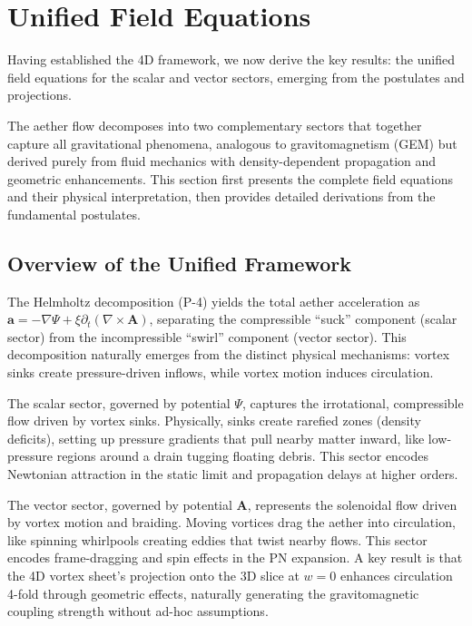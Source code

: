 \documentclass{article}
\begin{document}
\section{Unified Field Equations}

Having established the 4D framework, we now derive the key results: the unified field equations for the scalar and vector sectors, emerging from the postulates and projections.

The aether flow decomposes into two complementary sectors that together capture all gravitational phenomena, analogous to gravitomagnetism (GEM) but derived purely from fluid mechanics with density-dependent propagation and geometric enhancements. This section first presents the complete field equations and their physical interpretation, then provides detailed derivations from the fundamental postulates.

\subsection{Overview of the Unified Framework}

The Helmholtz decomposition (P-4) yields the total aether acceleration as $\mathbf{a} = -\nabla \Psi + \xi \partial_t (\nabla \times \mathbf{A})$, separating the compressible ``suck'' component (scalar sector) from the incompressible ``swirl'' component (vector sector). This decomposition naturally emerges from the distinct physical mechanisms: vortex sinks create pressure-driven inflows, while vortex motion induces circulation.

The scalar sector, governed by potential $\Psi$, captures the irrotational, compressible flow driven by vortex sinks. Physically, sinks create rarefied zones (density deficits), setting up pressure gradients that pull nearby matter inward, like low-pressure regions around a drain tugging floating debris. This sector encodes Newtonian attraction in the static limit and propagation delays at higher orders.

The vector sector, governed by potential $\mathbf{A}$, represents the solenoidal flow driven by vortex motion and braiding. Moving vortices drag the aether into circulation, like spinning whirlpools creating eddies that twist nearby flows. This sector encodes frame-dragging and spin effects in the PN expansion. A key result is that the 4D vortex sheet's projection onto the 3D slice at $w=0$ enhances circulation 4-fold through geometric effects, naturally generating the gravitomagnetic coupling strength without ad-hoc assumptions.
\end{document}
